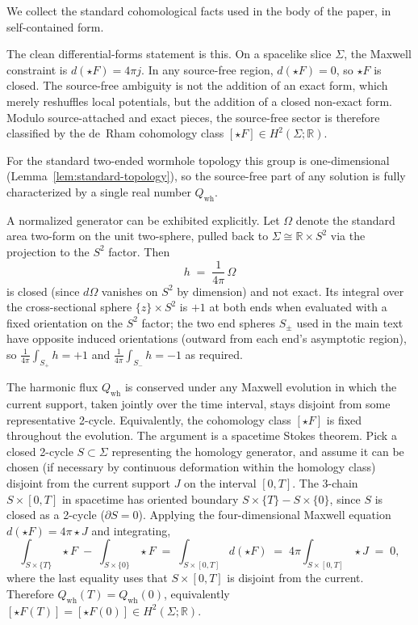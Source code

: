 \documentclass[aps,prd,onecolumn,nofootinbib,superscriptaddress]{revtex4-2}
\begin{document}
We collect the standard cohomological facts used in the body of the paper, in self-contained form.

The clean differential-forms statement is this. On a spacelike slice $\Sigma$, the Maxwell constraint is $d(\star F)=4\pi j$. In any source-free region, $d(\star F)=0$, so $\star F$ is closed. The source-free ambiguity is not the addition of an exact form, which merely reshuffles local potentials, but the addition of a closed non-exact form. Modulo source-attached and exact pieces, the source-free sector is therefore classified by the de~Rham cohomology class $[\star F]\in H^2(\Sigma;\mathbb{R})$.

For the standard two-ended wormhole topology this group is one-dimensional (Lemma~\ref{lem:standard-topology}), so the source-free part of any solution is fully characterized by a single real number $Q_{\mathrm{wh}}$.

A normalized generator can be exhibited explicitly. Let $\Omega$ denote the standard area two-form on the unit two-sphere, pulled back to $\Sigma \cong \mathbb{R}\times S^2$ via the projection to the $S^2$ factor. Then
\begin{equation}
h \;=\; \frac{1}{4\pi}\,\Omega
\end{equation}
is closed (since $d\Omega$ vanishes on $S^2$ by dimension) and not exact. Its integral over the cross-sectional sphere $\{z\}\times S^2$ is $+1$ at both ends when evaluated with a fixed orientation on the $S^2$ factor; the two end spheres $S_\pm$ used in the main text have opposite induced orientations (outward from each end's asymptotic region), so $\frac{1}{4\pi}\int_{S_+} h = +1$ and $\frac{1}{4\pi}\int_{S_-} h = -1$ as required.

The harmonic flux $Q_{\mathrm{wh}}$ is conserved under any Maxwell evolution in which the current support, taken jointly over the time interval, stays disjoint from some representative 2-cycle. Equivalently, the cohomology class $[\star F]$ is fixed throughout the evolution. The argument is a spacetime Stokes theorem. Pick a closed 2-cycle $S \subset \Sigma$ representing the homology generator, and assume it can be chosen (if necessary by continuous deformation within the homology class) disjoint from the current support $J$ on the interval $[0,T]$. The 3-chain $S\times[0,T]$ in spacetime has oriented boundary $S\times\{T\} - S\times\{0\}$, since $S$ is closed as a 2-cycle ($\partial S = 0$). Applying the four-dimensional Maxwell equation $d(\star F) = 4\pi \star J$ and integrating,
\begin{equation}
\int_{S\times\{T\}} \star F \;-\; \int_{S\times\{0\}} \star F \;=\; \int_{S\times[0,T]} d(\star F) \;=\; 4\pi\int_{S\times[0,T]} \star J \;=\; 0,
\end{equation}
where the last equality uses that $S\times[0,T]$ is disjoint from the current. Therefore $Q_{\mathrm{wh}}(T) = Q_{\mathrm{wh}}(0)$, equivalently $[\star F(T)] = [\star F(0)] \in H^2(\Sigma;\mathbb{R})$.
\end{document}
